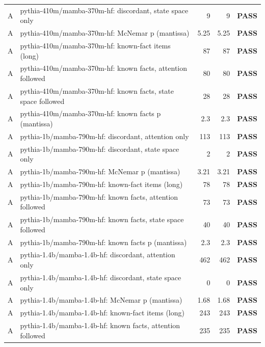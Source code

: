 {\begin{longtable}{@{}cp{8.2cm}rrc@{}}
A & pythia-410m/mamba-370m-hf: discordant, state space only & 9 & 9 & \textcolor{okgreen}{\textbf{PASS}} \\
A & pythia-410m/mamba-370m-hf: McNemar p (mantissa) & 5.25 & 5.25 & \textcolor{okgreen}{\textbf{PASS}} \\
A & pythia-410m/mamba-370m-hf: known-fact items (long) & 87 & 87 & \textcolor{okgreen}{\textbf{PASS}} \\
A & pythia-410m/mamba-370m-hf: known facts, attention followed & 80 & 80 & \textcolor{okgreen}{\textbf{PASS}} \\
A & pythia-410m/mamba-370m-hf: known facts, state space followed & 28 & 28 & \textcolor{okgreen}{\textbf{PASS}} \\
A & pythia-410m/mamba-370m-hf: known facts p (mantissa) & 2.3 & 2.3 & \textcolor{okgreen}{\textbf{PASS}} \\
A & pythia-1b/mamba-790m-hf: discordant, attention only & 113 & 113 & \textcolor{okgreen}{\textbf{PASS}} \\
A & pythia-1b/mamba-790m-hf: discordant, state space only & 2 & 2 & \textcolor{okgreen}{\textbf{PASS}} \\
A & pythia-1b/mamba-790m-hf: McNemar p (mantissa) & 3.21 & 3.21 & \textcolor{okgreen}{\textbf{PASS}} \\
A & pythia-1b/mamba-790m-hf: known-fact items (long) & 78 & 78 & \textcolor{okgreen}{\textbf{PASS}} \\
A & pythia-1b/mamba-790m-hf: known facts, attention followed & 73 & 73 & \textcolor{okgreen}{\textbf{PASS}} \\
A & pythia-1b/mamba-790m-hf: known facts, state space followed & 40 & 40 & \textcolor{okgreen}{\textbf{PASS}} \\
A & pythia-1b/mamba-790m-hf: known facts p (mantissa) & 2.3 & 2.3 & \textcolor{okgreen}{\textbf{PASS}} \\
A & pythia-1.4b/mamba-1.4b-hf: discordant, attention only & 462 & 462 & \textcolor{okgreen}{\textbf{PASS}} \\
A & pythia-1.4b/mamba-1.4b-hf: discordant, state space only & 0 & 0 & \textcolor{okgreen}{\textbf{PASS}} \\
A & pythia-1.4b/mamba-1.4b-hf: McNemar p (mantissa) & 1.68 & 1.68 & \textcolor{okgreen}{\textbf{PASS}} \\
A & pythia-1.4b/mamba-1.4b-hf: known-fact items (long) & 243 & 243 & \textcolor{okgreen}{\textbf{PASS}} \\
A & pythia-1.4b/mamba-1.4b-hf: known facts, attention followed & 235 & 235 & \textcolor{okgreen}{\textbf{PASS}} \\

\end{longtable}}
